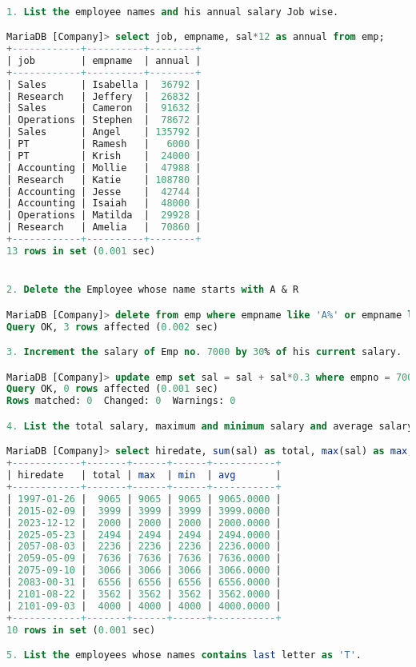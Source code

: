 \documentclass[11pt]{article}
\begin{document}
\begin{lstlisting}[language=SQL]

1. List the employee names and his annual salary Job wise.

MariaDB [Company]> select job, empname, sal*12 as annual from emp;
+------------+----------+--------+
| job        | empname  | annual |
+------------+----------+--------+
| Sales      | Isabella |  36792 |
| Research   | Jeffery  |  26832 |
| Sales      | Cameron  |  91632 |
| Operations | Stephen  |  78672 |
| Sales      | Angel    | 135792 |
| PT         | Ramesh   |   6000 |
| PT         | Krish    |  24000 |
| Accounting | Mollie   |  47988 |
| Research   | Katie    | 108780 |
| Accounting | Jesse    |  42744 |
| Accounting | Isaiah   |  48000 |
| Operations | Matilda  |  29928 |
| Research   | Amelia   |  70860 |
+------------+----------+--------+
13 rows in set (0.001 sec)


2. Delete the Employee whose name starts with A & R

MariaDB [Company]> delete from emp where empname like 'A%' or empname like 'R%';
Query OK, 3 rows affected (0.002 sec)

3. Increment the salary of Emp no. 7000 by 30% of his current salary.

MariaDB [Company]> update emp set sal = sal + sal*0.3 where empno = 7000;
Query OK, 0 rows affected (0.001 sec)
Rows matched: 0  Changed: 0  Warnings: 0

4. List the total salary, maximum and minimum salary and average salary of the employees hire date wise.

MariaDB [Company]> select hiredate, sum(sal) as total, max(sal) as max, min(sal) as min, avg(sal) as avg from emp group by hiredate;
+------------+-------+------+------+-----------+
| hiredate   | total | max  | min  | avg       |
+------------+-------+------+------+-----------+
| 1997-01-26 |  9065 | 9065 | 9065 | 9065.0000 |
| 2015-02-09 |  3999 | 3999 | 3999 | 3999.0000 |
| 2023-12-12 |  2000 | 2000 | 2000 | 2000.0000 |
| 2025-05-23 |  2494 | 2494 | 2494 | 2494.0000 |
| 2057-08-03 |  2236 | 2236 | 2236 | 2236.0000 |
| 2059-05-09 |  7636 | 7636 | 7636 | 7636.0000 |
| 2075-09-10 |  3066 | 3066 | 3066 | 3066.0000 |
| 2083-00-31 |  6556 | 6556 | 6556 | 6556.0000 |
| 2101-08-22 |  3562 | 3562 | 3562 | 3562.0000 |
| 2101-09-03 |  4000 | 4000 | 4000 | 4000.0000 |
+------------+-------+------+------+-----------+
10 rows in set (0.001 sec)

5. List the employees whose names contains last letter as 'T'.


\end{lstlisting}
\end{document}
